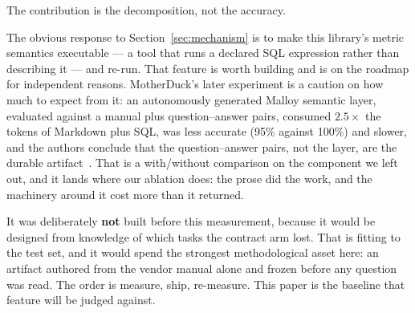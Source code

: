 The contribution is the decomposition, not the accuracy.

The obvious response to Section~\ref{sec:mechanism} is to make this library's
metric semantics executable --- a tool that runs a declared SQL expression
rather than describing it --- and re-run. That feature is worth building and is
on the roadmap for independent reasons. MotherDuck's later experiment is a
caution on how much to expect from it: an autonomously generated Malloy
semantic layer, evaluated against a manual plus question--answer pairs,
consumed $2.5{\times}$ the tokens of Markdown plus SQL, was less accurate
(95\% against 100\%) and slower, and the authors conclude that the
question--answer pairs, not the layer, are the durable
artifact~\cite{motherduck-ai-writes}. That is a with/without comparison on
the component we left out, and it lands where our ablation does: the prose
did the work, and the machinery around it cost more than it returned.

It was deliberately \textbf{not} built before this measurement, because it
would be designed from knowledge of which tasks the contract arm lost. That is
fitting to the test set, and it would spend the strongest methodological asset
here: an artifact authored from the vendor manual alone and frozen before any
question was read. The order is measure, ship, re-measure. This paper is the
baseline that feature will be judged against.
